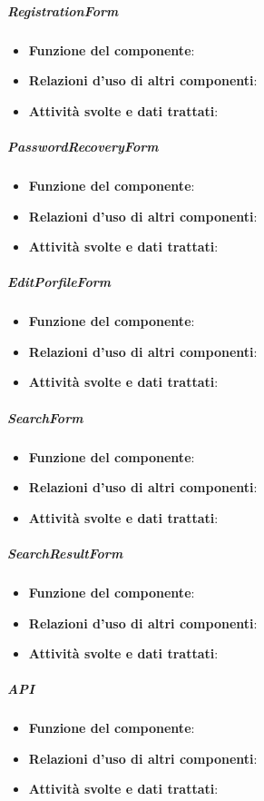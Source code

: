 \subparagraph{RegistrationForm}
\begin{itemize}
	\item \textbf{Funzione del componente}: 
	\item \textbf{Relazioni d’uso di altri componenti}: 
	\item \textbf{Attività svolte e dati trattati}: 
\end{itemize}

\subparagraph{PasswordRecoveryForm}
\begin{itemize}
	\item \textbf{Funzione del componente}: 
	\item \textbf{Relazioni d’uso di altri componenti}: 
	\item \textbf{Attività svolte e dati trattati}: 
\end{itemize}

\subparagraph{EditPorfileForm}
\begin{itemize}
	\item \textbf{Funzione del componente}: 
	\item \textbf{Relazioni d’uso di altri componenti}: 
	\item \textbf{Attività svolte e dati trattati}: 
\end{itemize}

\subparagraph{SearchForm}
\begin{itemize}
	\item \textbf{Funzione del componente}: 
	\item \textbf{Relazioni d’uso di altri componenti}: 
	\item \textbf{Attività svolte e dati trattati}: 
\end{itemize}

\subparagraph{SearchResultForm}
\begin{itemize}
	\item \textbf{Funzione del componente}: 
	\item \textbf{Relazioni d’uso di altri componenti}: 
	\item \textbf{Attività svolte e dati trattati}: 
\end{itemize}

\subparagraph{API}
\begin{itemize}
	\item \textbf{Funzione del componente}: 
	\item \textbf{Relazioni d’uso di altri componenti}: 
	\item \textbf{Attività svolte e dati trattati}: 
\end{itemize}

